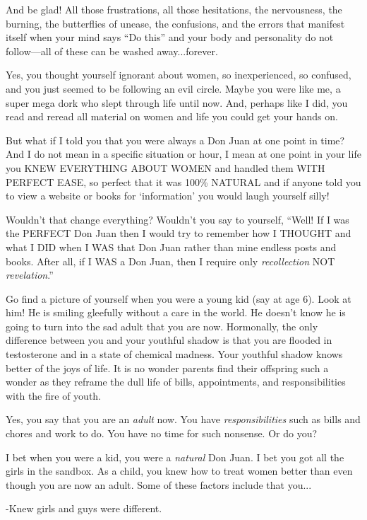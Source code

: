 			And be glad! All those frustrations, all those hesitations, the nervousness, the burning, the butterflies of unease, the confusions, and the errors that manifest itself when your mind says ``Do this'' and your body and personality do not follow---all of these can be washed away...forever.

			Yes, you thought yourself ignorant about women, so inexperienced, so confused, and you just seemed to be following an evil circle. Maybe you were like me, a super mega dork who slept through life until now. And, perhaps like I did, you read and reread all material on women and life you could get your hands on.

			But what if I told you that you were always a Don Juan at one point in time? And I do not mean in a specific situation or hour, I mean at one point in your life you KNEW EVERYTHING ABOUT WOMEN and handled them WITH PERFECT EASE, so perfect that it was 100\% NATURAL and if anyone told you to view a website or books for `information' you would laugh yourself silly!

			Wouldn't that change everything? Wouldn't you say to yourself, ``Well! If I was the PERFECT Don Juan then I would try to remember how I THOUGHT and what I DID when I WAS that Don Juan rather than mine endless posts and books. After all, if I WAS a Don Juan, then I require only \textit{recollection} NOT \textit{revelation}.''
			
			Go find a picture of yourself when you were a young kid (say at age 6). Look at him! He is smiling gleefully without a care in the world. He doesn't know he is going to turn into the sad adult that you are now. Hormonally, the only difference between you and your youthful shadow is that you are flooded in testosterone and in a state of chemical madness. Your youthful shadow knows better of the joys of life. It is no wonder parents find their offspring such a wonder as they reframe the dull life of bills, appointments, and responsibilities with the fire of youth.

			Yes, you say that you are an \textit{adult} now. You have \textit{responsibilities} such as bills and chores and work to do. You have no time for such nonsense. Or do you?
			
			I bet when you were a kid, you were a \textit{natural} Don Juan. I bet you got all the girls in the sandbox. As a child, you knew how to treat women better than even though you are now an adult. Some of these factors include that you...
			
			-Knew girls and guys were different.

